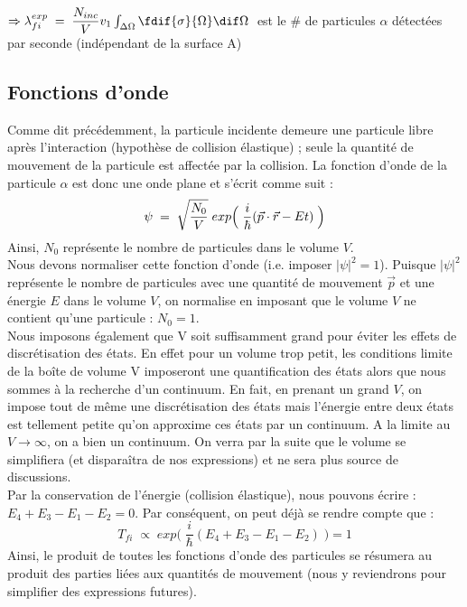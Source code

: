$\Rightarrow \lambda^{exp}_{fi} \eq \dfrac{N_{inc}}{V}v_1\int_{\Delta \Omega}\fdif{\sigma}{\Omega}\dif\Omega \;$  est le \# de particules $\alpha$ détectées par seconde (indépendant de la surface A)


\subsection{Fonctions d'onde}\label{fct_onde}


Comme dit précédemment, la particule incidente demeure une particule libre après l'interaction (hypothèse de collision élastique) ; seule la quantité de mouvement de la particule est affectée par la collision. La fonction d'onde de la particule $\alpha$ est donc une onde plane et s'écrit comme suit :
\begin{equation*}
    \psi \; = \; \sqrt{\dfrac{N_0}{V}} \; exp\Big( \;\dfrac{i}{\hbar}(\vec{p}\cdot\vec{r} - Et) \; \Big)
\end{equation*}
Ainsi, $N_0$ représente le nombre de particules dans le volume $V$.\\
Nous devons normaliser cette fonction d'onde (i.e. imposer $|\psi|^2 = 1$). Puisque $|\psi|^2$ représente le nombre de particules avec une quantité de mouvement $\vec{p}$ et une énergie $E$ dans le volume $V$, on normalise en imposant que le volume $V$ ne contient qu'une particule : $N_0 = 1$.\\

Nous imposons également que V soit suffisamment grand pour éviter les effets de discrétisation des états. En effet pour un volume trop petit, les conditions limite de la boîte de volume V imposeront une quantification des états alors que nous sommes à la recherche d'un continuum. En fait, en prenant un grand $V$, on impose tout de même une discrétisation des états mais l'énergie entre deux états est tellement petite qu'on approxime ces états par un continuum. A la limite au $V \rightarrow \infty$, on a bien un continuum. On verra par la suite que le volume se simplifiera (et disparaîtra de nos expressions) et ne sera plus source de discussions.\\

Par la conservation de l'énergie (collision élastique), nous pouvons écrire : $E_4 + E_3 - E_1 - E_2 = 0$. Par conséquent, on peut déjà se rendre compte que :
\begin{equation*}
    T_{fi} \; \propto \; exp\Big( \;\dfrac{i}{\hbar} (E_4 + E_3 - E_1 - E_2) \; \Big) = 1
\end{equation*}
Ainsi, le produit de toutes les fonctions d'onde des particules se résumera au produit des parties liées aux quantités de mouvement (nous y reviendrons pour simplifier des expressions futures).


